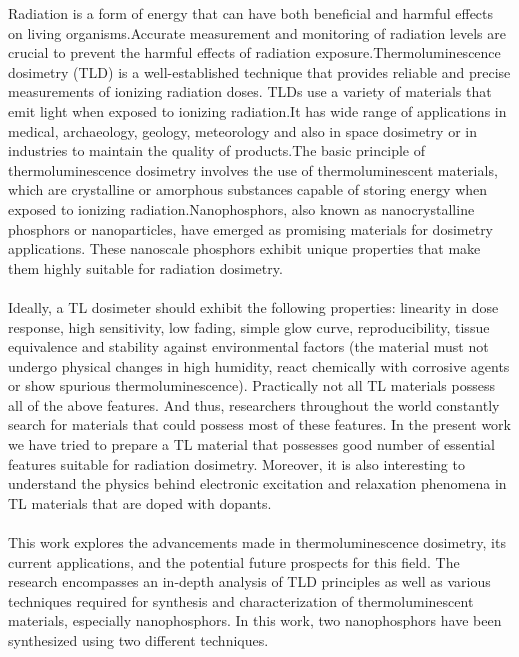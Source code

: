\documentclass[../Report.tex]{subfiles}
\begin{document}
    \vspace{1cm}
    \large
    Radiation is a form of energy that can have both beneficial and harmful effects on living organisms.Accurate measurement
    and monitoring of radiation levels are crucial to prevent the harmful effects of radiation exposure.Thermoluminescence dosimetry
    (TLD) is a well-established technique that provides reliable and precise measurements of ionizing radiation
    doses. TLDs use a variety of materials that emit light when exposed to ionizing radiation.It has wide range of 
    applications in medical, archaeology, geology, meteorology and also in space dosimetry or in industries to 
    maintain the quality of products.The basic principle of thermoluminescence dosimetry involves the use of 
    thermoluminescent materials, which are crystalline or amorphous substances capable of storing energy when 
    exposed to ionizing radiation.Nanophosphors, also known as nanocrystalline phosphors or nanoparticles, have 
    emerged as promising materials for dosimetry applications. These nanoscale phosphors exhibit unique properties 
    that make them highly suitable for radiation dosimetry.
    \\~\\
    Ideally, a TL dosimeter should exhibit the following properties: linearity in dose response, high sensitivity, 
    low fading, simple glow curve, reproducibility, tissue equivalence and stability against environmental factors 
    (the material must not undergo physical changes in high humidity, react chemically with corrosive agents or 
    show spurious thermoluminescence). Practically not all TL materials possess all of the above features. And thus, 
    researchers throughout the world constantly search for materials that could possess most of these features. In 
    the present work we have tried to prepare a TL material that possesses good number of essential features suitable 
    for radiation dosimetry. Moreover, it is also interesting to understand the physics behind electronic excitation 
    and relaxation phenomena in TL materials that are doped with dopants.
    \\~\\
    This work explores the advancements made in thermoluminescence dosimetry, its current applications, and the 
    potential future prospects for this field. The research encompasses an in-depth analysis of TLD principles as 
    well as various techniques required for synthesis and characterization of thermoluminescent materials, 
    especially nanophosphors. In this work, two nanophosphors have been synthesized using two different techniques.
\end{document}
